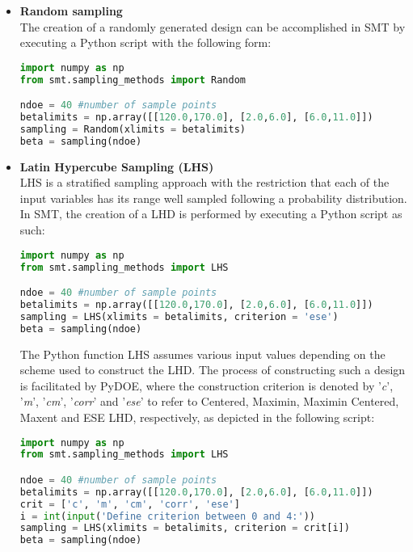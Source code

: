 \begin{itemize}
\item \textbf{Random sampling} \\
The creation of a randomly generated design can be accomplished 
in SMT by executing a Python script with the following form:

\begin{lstlisting}[language = Python, caption = Implementation of 
Random sampling]
import numpy as np
from smt.sampling_methods import Random

ndoe = 40 #number of sample points
betalimits = np.array([[120.0,170.0], [2.0,6.0], [6.0,11.0]])
sampling = Random(xlimits = betalimits)   
beta = sampling(ndoe)
\end{lstlisting}

\item \textbf{Latin Hypercube Sampling (LHS)} \\
LHS is a stratiﬁed sampling approach with the restriction that each 
of the input variables has its range well sampled following a 
probability distribution. In SMT, the creation of a LHD is 
performed by executing a Python script as such: 

\begin{lstlisting}[language = Python, caption = Implementation of 
LHS]
import numpy as np
from smt.sampling_methods import LHS

ndoe = 40 #number of sample points
betalimits = np.array([[120.0,170.0], [2.0,6.0], [6.0,11.0]])
sampling = LHS(xlimits = betalimits, criterion = 'ese')   
beta = sampling(ndoe)
\end{lstlisting}

The Python function LHS assumes various input values depending 
on the scheme used to construct the LHD. The process of 
constructing such a design is facilitated by PyDOE\cite{pyDOE}, 
where the construction criterion is denoted by '\textit{c}',
'\textit{m}', '\textit{cm}', '\textit{corr}' and '\textit{ese}'
to refer to Centered, Maximin, Maximin Centered, Maxent and ESE 
LHD, respectively, as depicted in the following script:

\begin{lstlisting}[language = Python, caption = Various 
construction criteria]
import numpy as np
from smt.sampling_methods import LHS

ndoe = 40 #number of sample points
betalimits = np.array([[120.0,170.0], [2.0,6.0], [6.0,11.0]])
crit = ['c', 'm', 'cm', 'corr', 'ese']
i = int(input('Define criterion between 0 and 4:'))
sampling = LHS(xlimits = betalimits, criterion = crit[i])
beta = sampling(ndoe)   
\end{lstlisting}


\end{itemize}
